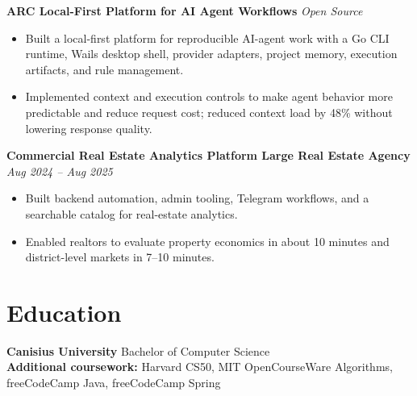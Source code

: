 \documentclass[10pt,a4paper]{article}
\begin{document}
\textbf{ARC \textbar{} Local-First Platform for AI Agent Workflows} \hfill \textit{Open Source}
\begin{itemize}
  \item Built a local-first platform for reproducible AI-agent work with a Go CLI runtime, Wails desktop shell, provider adapters, project memory, execution artifacts, and rule management.
  \item Implemented context and execution controls to make agent behavior more predictable and reduce request cost; reduced context load by 48\% without lowering response quality.
\end{itemize}

\textbf{Commercial Real Estate Analytics Platform \textbar{} Large Real Estate Agency} \hfill \textit{Aug 2024 -- Aug 2025}
\begin{itemize}
  \item Built backend automation, admin tooling, Telegram workflows, and a searchable catalog for real-estate analytics.
  \item Enabled realtors to evaluate property economics in about 10 minutes and district-level markets in 7--10 minutes.
\end{itemize}

\section*{Education}
\textbf{Canisius University} \textbar{} Bachelor of Computer Science\\
\textbf{Additional coursework:} Harvard CS50, MIT OpenCourseWare Algorithms, freeCodeCamp Java, freeCodeCamp Spring
\end{document}
